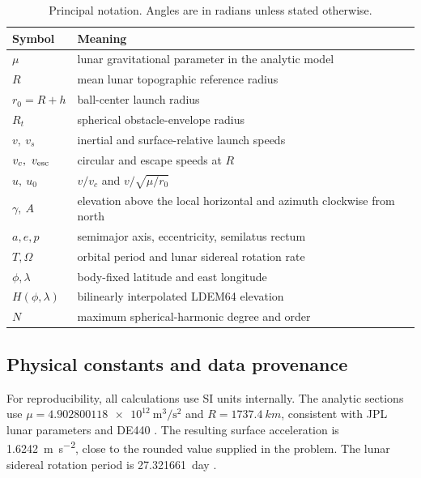 \begin{table}[!ht]
\caption{Principal notation. Angles are in radians unless stated otherwise.}
\label{tab:notation}
\footnotesize
\begin{ruledtabular}
\begin{tabular}{ll}
Symbol & Meaning \\
\hline
$\mu$ & \parbox[t]{0.70\columnwidth}{lunar gravitational parameter in the analytic model} \\
$R$ & mean lunar topographic reference radius \\
$r_0=R+h$ & ball-center launch radius \\
$R_t$ & spherical obstacle-envelope radius \\
$v,\ v_s$ & inertial and surface-relative launch speeds \\
$v_c,\ v_{\rm esc}$ & circular and escape speeds at $R$ \\
$u,\ u_0$ & \parbox[t]{0.70\columnwidth}{$v/v_c$ and $v/\sqrt{\mu/r_0}$} \\
$\gamma,\ A$ & \parbox[t]{0.70\columnwidth}{elevation above the local horizontal and azimuth clockwise from north} \\
$a,e,p$ & semimajor axis, eccentricity, semilatus rectum \\
$T,\Omega$ & orbital period and lunar sidereal rotation rate \\
$\phi,\lambda$ & body-fixed latitude and east longitude \\
$H(\phi,\lambda)$ & bilinearly interpolated LDEM64 elevation \\
$N$ & maximum spherical-harmonic degree and order
\end{tabular}
\end{ruledtabular}
\end{table}
\FloatBarrier

\subsection{Physical constants and data provenance}

For reproducibility, all calculations use SI units internally. The analytic sections use \(\mu=\SI{4.902800118e12}{\metre^3\per\square\second}\) and \(R=\SI{1737.4}{km}\), consistent with JPL lunar parameters and DE440 \cite{Park2021,JPLParameters}. The resulting surface acceleration is \SI{1.6242}{\metre\per\square\second}, close to the rounded value supplied in the problem. The lunar sidereal rotation period is \SI{27.321661}{day} \cite{Archinal2018,NASAMoonRotation}.

